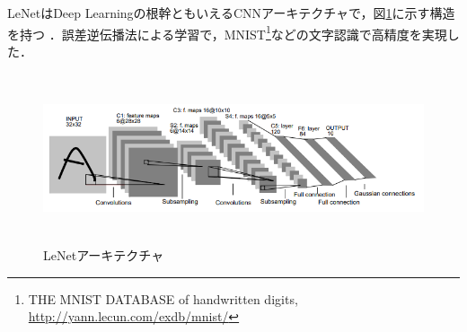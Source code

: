 LeNetはDeep Learningの根幹ともいえるCNNアーキテクチャで，図\ref{arch_lenet}に示す構造を持つ \cite{arxiv_lenet} \cite{arch_lenet}．誤差逆伝播法による学習で，MNIST\footnote{THE MNIST DATABASE of handwritten digits, \url{http://yann.lecun.com/exdb/mnist/}}などの文字認識で高精度を実現した．

\begin{figure} [H]
	\begin{center}
		\includegraphics[clip, height=5cm, bb=-30 0 711 200]{data/figure/arch_lenet.png}
		\caption{LeNetアーキテクチャ}
		\label{arch_lenet}
	\end{center}
\end{figure}
